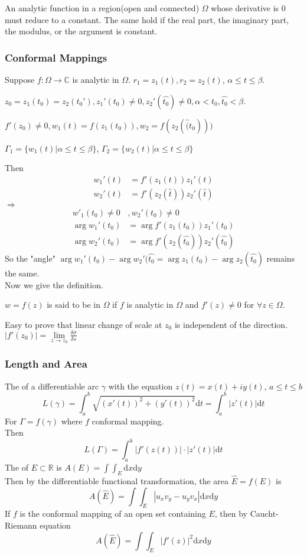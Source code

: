 \begin{theorem}
    An analytic function in a region(\ie open and connected) $ \Omega $ whose derivative is 0 must reduce to a constant. The same hold if the real part, the imaginary part, the modulus, or the argument is constant.
\end{theorem}
\subsubsection{Conformal Mappings}
Suppose  $ f:\Omega\rightarrow \mathbb{C}$ is analytic in  $ \Omega $.  $ r_1=z_1(t),r_2=z_2(t) $, $ \alpha \leq t \leq \beta $.

 $ z_0=z_1(t_0)=z_2(t_0') ,z_1'(t_0)\not=0,z_2'(\hat{t_0})\not=0,\alpha<t_0,\hat{t_0}<\beta$.
 
  $ f'(z_0)\not=0, w_1(t)=f(z_1(t_0)),w_2=f(z_2(\hat(t_0))) $
  
   $ \Gamma_1=\{w_1(t)|\alpha \leq t \leq \beta\} $,  $ \Gamma_2=\{w_2(t)|\alpha \leq t \leq \beta\}$        
   
Then 
\begin{align*}
    w_1'(t)&=f'(z_1(t))z_1'(t)\\
    w_2'(t)&=f'(z_2(\hat{t}))z_2'(\hat{t})
\end{align*}
 $ \Rightarrow  $
 \begin{align*}
    w'_1(t_0)\not=0&,w_2'(t_0)\not=0\\
    \arg w_1'(t_0)&=\arg f'(z_1(t_0))z_1'(t_0)\\
    \arg w_2'(t_0)&=\arg f'(z_2(\hat{t_0}))z_2'(\hat{t_0})
 \end{align*} 
So the "angle"  $ \arg w_1'(t_0)-\arg w_2'(\hat{t_0}=\arg z_1(t_0)-\arg z_2(\hat{t_0}) $ remains the same. \\
Now we give the definition.
\begin{definition}
     $ w=f(z) $ is said to be  in  $ \Omega $ if  $ f  $ is analytic in  $ \Omega  $ and  $ f'(z)\not=0 $ for  $ \forall z\in \Omega$.    
\end{definition}
Easy to prove that linear change of scale at  $ z_0 $  is independent of the direction.\\
\ie  $ |f'(z_0)|=\lim\limits_{z\to z_0}\frac{\delta \sigma}{\delta s} $ 
\subsubsection{Length and Area}
The  of a differentiable arc  $ \gamma $ with the equation  $ z(t)=x(t)+iy(t) $, $ a \leq t \leq b $
\[L(\gamma)=\int_{a }^{b }\sqrt{(x'(t))^2+(y'(t))^2}\mathrm{d}t=\int_{a }^{b }|z'(t)|\mathrm{d}t\]   
For  $ \Gamma=f(\gamma) $ where  $ f  $ conformal mapping.\\
Then 
\[L(\Gamma)=\int_{a}^{b}|f'(z(t))|\cdot|z'(t)|\mathrm{d}t\]
The  of  $ E\subset \mathbb{R} $ is  $ A(E)=\int \int_{E}\mathrm{d}x\mathrm{d}y $\\
Then by the differentiable functional transformation, the area $ \hat{E}=f(E) $ is 
\[A(\hat{E})=\int \int_E|u_xv_y-u_yv_x|\mathrm{d}x\mathrm{d}y\]  
If  $ f  $ is the conformal mapping of an open set containing  $ E  $, then by Caucht-Riemann equation
\[A(\hat{E})=\int\int_E|f'(z)|^2\mathrm{d}x\mathrm{d}y\]
